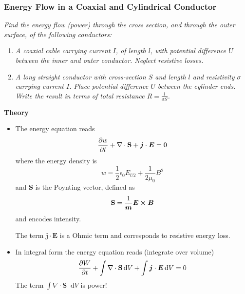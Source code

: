 \documentclass[11pt, a4paper]{article}
\newcommand{\diff}{\mathop{}\!\mathrm{d}} %
\renewcommand{\vec}[1]{\bm{#1}} %
\newcommand{\E}{\vec{E}}  %
\newcommand{\B}{\vec{B}}  %
\renewcommand{\S}{\mathbf{S}}  %
\newcommand{\ee}{\epsilon_{0}}  %
\newcommand{\mm}{\mu_{0}}  %
\newcommand{\m}{\vec{m}}  %
\newcommand{\Poy}{Poynting\xspace}
\renewcommand{\div}{\nabla \cdot}
\begin{document}
\subsubsection{Energy Flow in a Coaxial and Cylindrical Conductor}
\textit{Find the energy flow (power) through the cross section, and through the outer surface, of the following conductors:}
\begin{enumerate}
	\item \textit{A coaxial cable carrying current $ I $, of length $ l $, with potential difference $ U $ between the inner and outer conductor. Neglect resistive losses.}
	
	\item \textit{A long straight conductor with cross-section $ S $ and length $ l $ and resistivity $ \sigma $ carrying current $ I $. Place potential difference $ U $ between the cylinder ends. Write the result in terms of total resistance $ R = \frac{l}{\sigma S} $.}
\end{enumerate}


\textbf{Theory}
\begin{itemize}
	\item The energy equation reads
	\begin{equation*}
		\pdv{w}{t} + \div \S + \vec{j}\cdot \E = 0
	\end{equation*}
	where the energy density is
	\begin{equation*}
		w = \frac{1}{2}\ee E_{U2} + \frac{1}{2\mm}B^{2}
	\end{equation*}
	and $ \S $ is the \Poy vector, defined as
	\begin{equation*}
		\S = \frac{1}{\m}\E \cross \B
	\end{equation*}
	and encodes intensity. 
	
	The term $ \vec{j}\cdot \vec{E} $ is a Ohmic term and corresponds to resistive energy loss.
	
	\item In integral form the energy equation reads (integrate over volume)
	\begin{equation*}
		\pdv{W}{t} + \int \div \S \diff V + \int \vec{j}\cdot \E \diff V = 0
	\end{equation*}
	The term $ \int \div \S \diff V $ is power!
\end{itemize}
\end{document}
